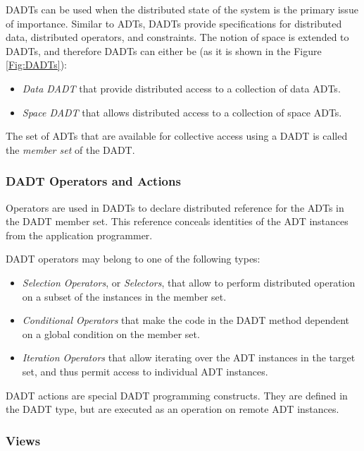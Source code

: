 DADTs can be used when the distributed state of the system is the primary issue of importance. Similar to ADTs, DADTs 
provide specifications for distributed data, distributed operators, and 
constraints. The notion of space is extended to DADTs, and therefore DADTs can
either be (as it is shown in the Figure \ref{Fig:DADTs}):

\begin{itemize}
  \item \emph{Data DADT} that provide distributed access to a collection of data
  ADTs.
  \item \emph{Space DADT} that allows distributed access to a collection of
  space ADTs. 
\end{itemize}

The set of ADTs that are available for collective access using a DADT is called the \emph{member set} of
the DADT.

\subsubsection{DADT Operators and Actions} \label{subsubsec:OperatorsAndActions}

Operators are used in DADTs to declare distributed reference for
the ADTs in the DADT member set. This reference conceals identities of the ADT
instances from the application programmer. 

DADT operators may belong to one of the following types:

\begin{itemize}
  \item \emph{Selection Operators}, or \emph{Selectors}, that allow to perform
  distributed operation on a subset of the instances in the member set.
  \item \emph{Conditional Operators} that make the code in the
  DADT method dependent on a global condition on the member set. 
  \item \emph{Iteration Operators} that allow iterating over the
  ADT instances in the target set, and thus permit access to individual ADT instances.
\end{itemize}

DADT actions are special DADT programming constructs. They are defined in the
DADT type, but are executed as an operation on remote ADT instances. 


\subsubsection{Views} \label{subsubsec:views}


